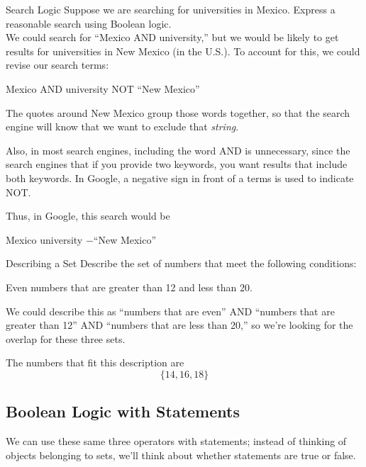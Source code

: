 \begin{example}[https://www.youtube.com/watch?v=E_BhHaTb1pw]{Search Logic}
Suppose we are searching for universities in Mexico.  Express a reasonable search using Boolean logic.\\

\sol
We could search for ``Mexico AND university,'' but we would be likely to get results for universities in New Mexico (in the U.S.).  To account for this, we could revise our search terms:
\begin{center}
Mexico AND university NOT ``New Mexico''
\end{center}
The quotes around New Mexico group those words together, so that the search engine will know that we want to exclude that \textit{string}.

Also, in most search engines, including the word AND is unnecessary, since the search engines that if you provide two keywords, you want results that include both keywords.  In Google, a negative sign in front of a terms is used to indicate NOT.

Thus, in Google, this search would be
\begin{center}
Mexico university $-$``New Mexico''
\end{center}
\end{example}

\begin{example}[https://www.youtube.com/watch?v=G-1JBcYqz_o]{Describing a Set}
Describe the set of numbers that meet the following conditions:
\begin{center}
Even numbers that are greater than 12 and less than 20.
\end{center}

\sol
We could describe this as ``numbers that are even'' AND ``numbers that are greater than 12'' AND ``numbers that are less than 20,'' so we're looking for the overlap for these three sets.

The numbers that fit this description are \[\{14,16,18\}\]
\end{example}

\subsection{Boolean Logic with Statements}
We can use these same three operators with statements; instead of thinking of objects belonging to sets, we'll think about whether statements are true or false.\\

